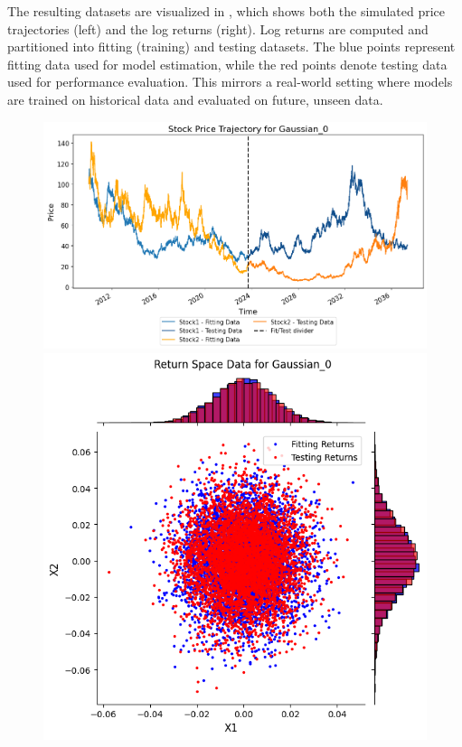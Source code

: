 The resulting datasets are visualized in , which shows both the simulated price trajectories (left) and the log returns (right). Log returns are computed and partitioned into fitting (training) and testing datasets. The blue points represent fitting data used for model estimation, while the red points denote testing data used for performance evaluation. This mirrors a real-world setting where models are trained on historical data and evaluated on future, unseen data.

\begin{figure}
    \centering
    \begin{minipage}{0.9\textwidth}
        \centering
        \begin{minipage}{0.54\textwidth}
            \centering
            \includegraphics[width=\textwidth]{4Method/pictures/PricePort1.png}
        \end{minipage}
        \hfill
        \begin{minipage}{0.34\textwidth}
            \centering
            \includegraphics[width=\textwidth]{4Method/pictures/ReturnPort1.png}

\end{minipage}
\end{minipage}
\end{figure}

